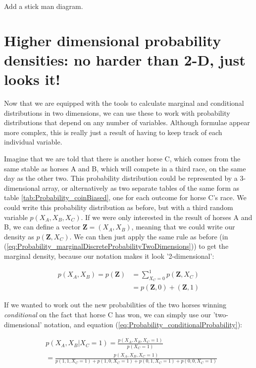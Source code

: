 \documentclass[11pt,fullpage]{book}
\begin{document}
Add a stick man diagram.

\section{Higher dimensional probability densities: no harder than 2-D, just looks it!}
Now that we are equipped with the tools to calculate marginal and conditional distributions in two dimensions, we can use these to work with probability distributions that depend on any number of variables. Although formulae appear more complex, this is really just a result of having to keep track of each individual variable.

Imagine that we are told that there is another horse C, which comes from the same stable as horses A and B, which will compete in a third race, on the same day as the other two. This probability distribution could be represented by a 3-dimensional array, or alternatively as two separate tables of the same form as table \ref{tab:Probability_coinBiased}, one for each outcome for horse C's race. We could write this probability distribution as before, but with a third random variable $p(X_A,X_B,X_C)$. If we were only interested in the result of horses A and B, we can define a vector $\boldsymbol{Z}=(X_A,X_B)$, meaning that we could write our density as $p(\boldsymbol{Z},X_C)$. We can then just apply the same rule as before (in (\ref{eq:Probability_marginalDiscreteProbabilityTwoDimensions})) to get the marginal density, because our notation makes it look '2-dimensional':

\begin{equation}\label{eq:Probability_3DDiscreteHorsesExample}
\begin{align}
p(X_A,X_B) = p(\boldsymbol{Z}) &= \sum\limits_{X_C=0}^{1} p(\boldsymbol{Z},X_C)\\
&= p(\boldsymbol{Z},0) + (\boldsymbol{Z},1)
\end{align}
\end{equation}

If we wanted to work out the new probabilities of the two horses winning \textit{conditional} on the fact that horse C has won, we can simply use our 'two-dimensional' notation, and equation (\ref{eq:Probability_conditionalProbability}):

\begin{equation}
\begin{align}
&p(X_A, X_B|X_C=1) = \frac{p(X_A,X_B,X_C=1)}{p(X_C=1)}\\
&= \frac{p(X_A,X_B,X_C=1)}{p(1,1,X_C=1) + p(1,0,X_C=1) + p(0,1,X_C=1) + p(0,0,X_C=1)}
\end{align}
\end{equation}
\end{document}
